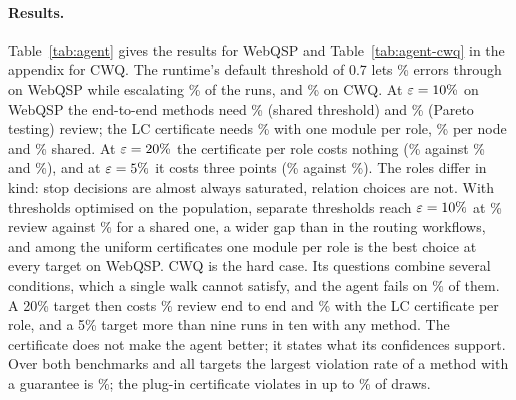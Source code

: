 \paragraph{Results.} Table~\ref{tab:agent} gives the results for WebQSP and
Table~\ref{tab:agent-cwq} in the appendix for CWQ. The runtime's default threshold of 0.7
lets \AgentDefaultRiskW\% errors through on WebQSP while escalating \AgentDefaultReviewW\% of
the runs, and \AgentDefaultRiskQ\% on CWQ. At $\varepsilon=10\%$ on WebQSP the end-to-end methods
need \RevWSharedTen\% (shared threshold) and \RevWParetoTen\% (Pareto testing) review; the LC
certificate needs \RevWLClevelTen\% with one module per role, \RevWLCnodeTen\% per node and
\RevWLCsharedTen\% shared. At $\varepsilon=20\%$ the certificate per role costs nothing
(\RevWLClevelTwenty\% against \RevWSharedTwenty\% and \RevWParetoTwenty\%), and at
$\varepsilon=5\%$ it costs three points (\RevWLClevelFive\% against \RevWParetoFive\%). The roles
differ in kind: stop decisions are almost always saturated, relation choices are not. With
thresholds optimised on the population, separate thresholds reach $\varepsilon=10\%$ at
\OracleNodeWTen\% review against \OracleSharedWTen\% for a shared one, a wider gap than in
the routing workflows, and among the uniform certificates one module per role is the best
choice at every target on WebQSP. CWQ is the hard case. Its questions combine several conditions, which a single walk
cannot satisfy, and the agent fails on \AgentErrQ\% of them. A 20\% target then costs
\RevQParetoTwenty\% review end to end and \RevQLClevelTwenty\% with the LC certificate per
role, and a 5\% target more than nine runs in ten with any method. The certificate does not
make the agent better; it states what its confidences support. Over both benchmarks and all
targets the largest violation rate of a method with a guarantee is \MaxViolCertifiedAgent\%;
the plug-in certificate violates in up to \ViolWPlugFive\% of draws.

